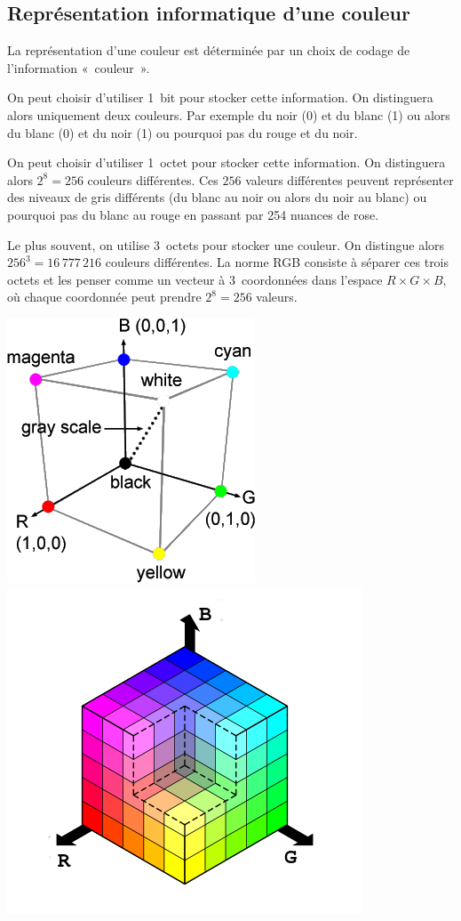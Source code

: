 \documentclass[10pt,fleqn]{article} %
\begin{document}

\vspace{5cm}
\pagestyle{fancy}
\thispagestyle{plain}


\def\columnseprulecolor{\color{ocre}}
\setlength{\columnseprule}{0.4pt} 
\ifprof
\else
\begin{multicols}{2}
\fi

\subsection*{Représentation informatique d'une couleur}
\ifprof
\else
La représentation d'une couleur est déterminée par un choix de codage de l'information
«~couleur~».

On peut choisir d'utiliser 1~bit pour stocker cette
information. On distinguera alors uniquement deux couleurs. Par
exemple du noir (0) et du blanc (1) ou alors du blanc (0) et du noir
(1) ou pourquoi pas du rouge et du noir. 

On peut choisir d'utiliser 1~octet pour stocker cette information. On
distinguera alors $2^8=256$ couleurs différentes. Ces $256$ valeurs
différentes peuvent représenter des niveaux de gris différents (du
blanc au noir ou alors du noir au blanc) ou pourquoi pas du blanc au
rouge en passant par 254 nuances de rose.

Le plus souvent, on utilise 3~octets pour stocker une couleur. On distingue
alors $256^3 = 16\,777\,216$ couleurs différentes. La norme RGB consiste à
séparer ces trois octets et les penser comme
 un vecteur à 3~coordonnées dans l'espace
$R\times G \times B$, où chaque coordonnée peut prendre $2^8=256$
valeurs. 

\begin{center}
  \includegraphics[width=.2\textwidth]{images/theme_image_1_fig_1}
  \includegraphics[width=.2\textwidth]{images/theme_image_1_fig_2}
\end{center}


\end{multicols}
\end{document}
